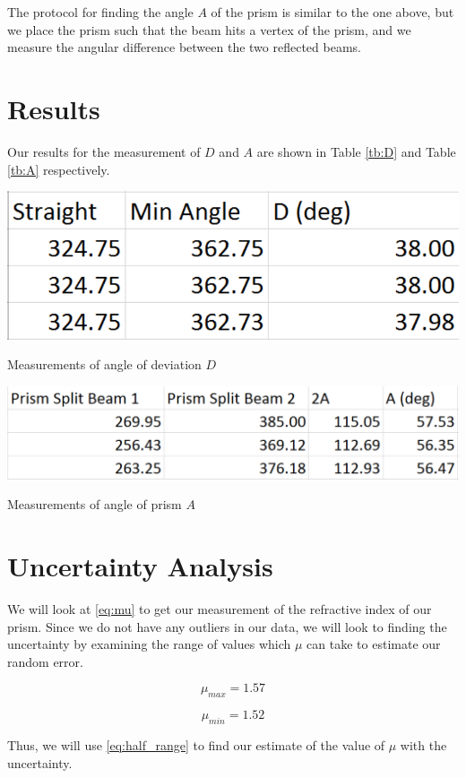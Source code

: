 \documentclass{article}
\begin{document}
The protocol for finding the angle $A$ of the prism is similar to the one above, but we place the prism such that the beam hits a vertex of the prism, and we measure the angular difference between the two reflected beams.

\section{Results}

Our results for the measurement of $D$ and $A$ are shown in Table \ref{tb:D} and Table \ref{tb:A} respectively.

\begin{table}
  \includegraphics[width=\textwidth]{./img/D.pdf}
  \caption{Measurements of angle of deviation $D$}
  \label{tb:D}
\end{table}

\begin{table}
  \includegraphics[width=\textwidth]{./img/A.pdf}
  \caption{Measurements of angle of prism $A$}
  \label{tb:A}
\end{table}

\section{Uncertainty Analysis}

We will look at \eqref{eq:mu} to get our measurement of the refractive index of our prism. Since we do not have any outliers in our data, we will look to finding the uncertainty by examining the range of values which $\mu$ can take to estimate our random error.

$$
\mu_{max} = 1.57
$$

$$
\mu_{min} = 1.52
$$

Thus, we will use \eqref{eq:half_range} to find our estimate of the value of $\mu$ with the uncertainty.
\end{document}
